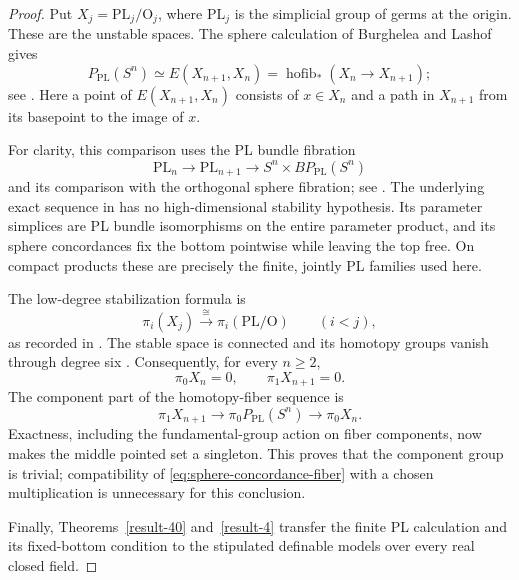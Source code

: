 \begin{proof}
Put $X_j=\mathrm{PL}_j/\mathrm O_j$, where $\mathrm{PL}_j$ is the
simplicial group of germs at the origin.  These are the unstable
spaces.  The sphere calculation of Burghelea and Lashof gives
\begin{equation}\label{eq:sphere-concordance-fiber}
 P_{\mathrm{PL}}(S^n)\simeq
 E(X_{n+1},X_n)
 =\operatorname{hofib}_{*}(X_n\longrightarrow X_{n+1});
\end{equation}
see \cite[Section~6, equation~(1), p.~43]{BurgheleaLashof1974II}.
Here a point of $E(X_{n+1},X_n)$ consists of $x\in X_n$ and a path
in $X_{n+1}$ from its basepoint to the image of $x$.

For clarity, this comparison uses the PL bundle fibration
\[
 \mathrm{PL}_n\longrightarrow\mathrm{PL}_{n+1}
       \longrightarrow S^n\times BP_{\mathrm{PL}}(S^n)
\]
and its comparison with the orthogonal sphere fibration; see
\cite[Proposition~5.3 and the preceding paragraph, p.~38]
{BurgheleaLashof1974II}.  The underlying exact sequence in
\cite[Theorem~1 and definitions, pp.~243--244]{KuiperLashof1966II}
has no high-dimensional stability hypothesis.  Its parameter simplices
are PL bundle isomorphisms on the entire parameter product, and its
sphere concordances fix the bottom pointwise while leaving the top
free.  On compact products these are precisely the finite, jointly PL
families used here.

The low-degree stabilization formula is
\[
 \pi_i(X_j)\xrightarrow{\ \cong\ }
       \pi_i(\mathrm{PL}/\mathrm O)\qquad(i<j),
\]
as recorded in \cite[Section~5, formula~(3), p.~37]
{BurgheleaLashof1974II}.  The stable space is connected and its
homotopy groups vanish through degree six
\cite[Annex~C, calculation following Theorem~5.4, p.~318]
{KirbySiebenmann1977}.  Consequently, for every $n\geq2$,
\[
                 \pi_0X_n=0,
                 \qquad \pi_1X_{n+1}=0.
\]
The component part of the homotopy-fiber sequence is
\[
 \pi_1X_{n+1}\longrightarrow
 \pi_0P_{\mathrm{PL}}(S^n)\longrightarrow\pi_0X_n.
\]
Exactness, including the fundamental-group action on fiber
components, now makes the middle pointed set a singleton.  This
proves that the component group is trivial; compatibility of
\eqref{eq:sphere-concordance-fiber} with a chosen multiplication is
unnecessary for this conclusion.

Finally, Theorems~\ref{result-40} and~\ref{result-4} transfer the
finite PL calculation and its fixed-bottom condition to the
stipulated definable models over every real closed field.
\end{proof}

